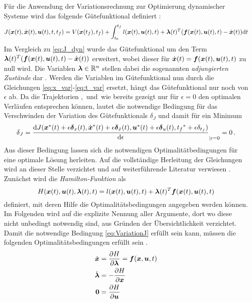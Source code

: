 Für die Anwendung der Variationsrechnung zur Optimierung dynamischer Systeme wird das folgende Gütefunktional definiert \cite{KnutGraichen.2012}:
\begin{equation}
J(\boldsymbol{x}(t),\dot{\boldsymbol{x}}(t),\boldsymbol{u}(t),t,t_f) = V(\boldsymbol{x}(t_f),t_f) + \int_{t_0}^{t_f}l(\boldsymbol{x}(t),\boldsymbol{u}(t),t) + \boldsymbol{\lambda}(t)^T(\boldsymbol{f}(\boldsymbol{x}(t),\boldsymbol{u}(t),t) - \dot{\boldsymbol{x}}(t))\textrm{d}{t} \label{eq:J_var_sys}
\end{equation}
Im Vergleich zu \ref{eq:J_dyn} wurde das Gütefunktional um den Term $\boldsymbol{\lambda}(t)^T(\boldsymbol{f}(\boldsymbol{x}(t),\boldsymbol{u}(t),t) - \dot{\boldsymbol{x}}(t))$ erweitert, wobei dieser für $\dot{\boldsymbol{x}}(t) = \boldsymbol{f}(\boldsymbol{x}(t),\boldsymbol{u}(t),t)$ zu null wird. Die Variablen $\boldsymbol{\lambda}\in\mathbb{R}^n$ stellen dabei die sogenannten \textit{adjungierten Zustände} dar \cite{KnutGraichen.2012}. Werden die Variablen im Gütefunktional nun durch die Gleichungen \ref{eq:x_var}-\ref{eq:t_var} ersetzt, hängt das Gütefunktional nur noch von $\epsilon$ ab. Da die Trajektorien \xoft, \dxoft\,und \uoft\,wie bereits gezeigt nur für $\epsilon=0$ den optimalen Verläufen entsprechen können, lautet die notwendige Bedingung für das Verschwinden der Variation des Gütefunktionals $\delta_J$ und damit für ein Minimum 
\begin{equation}
	\delta_J = \frac{\textrm{d}J({\boldsymbol{x}}^*(t)+\epsilon\boldsymbol{\delta}_{x}(t),\dot{\boldsymbol{x}}^*(t) + \epsilon\boldsymbol{\delta}_{\dot{x}}(t),{\boldsymbol{u}}^*(t) + \epsilon\boldsymbol{\delta}_{u}(t),{t_f}^* + \epsilon\delta_{t_f})}{\textrm{d}{\epsilon}}_{|\epsilon=0}=0\,. \label{eq:VariationJ}
\end{equation}
Aus dieser Bedingung lassen sich die notwendigen Optimalitätbedingungen für eine optimale Lösung herleiten. Auf die vollständige Herleitung der Gleichungen wird an dieser Stelle verzichtet und auf weiterführende Literatur verwiesen \cite{KnutGraichen.2012,Papageorgiou.2012,Gerdts.2010}.
Zunächst wird die \textit{Hamilton-Funktion} als 
\begin{equation}
	H(\boldsymbol{x}(t),\boldsymbol{u}(t),\boldsymbol{\lambda}(t),t) = l(\boldsymbol{x}(t),\boldsymbol{u}(t),t) + \boldsymbol{\lambda}(t)^T\boldsymbol{f}(\boldsymbol{x}(t),\boldsymbol{u}(t),t) \label{eq:Hamilton}
\end{equation}
definiert, mit deren Hilfe die Optimalitätsbedingungen angegeben werden können. Im Folgenden wird auf die explizite Nennung aller Argumente, dort wo diese nicht unbedingt notwendig sind, aus Gründen der Übersichtlichkeit verzichtet. Damit die notwendige Bedingung \ref{eq:VariationJ} erfüllt sein kann, müssen die folgenden Optimalitätsbedingungen erfüllt sein \cite{KnutGraichen.2012}.
\begin{align}
	\dot{\boldsymbol{x}} &= \frac{\partial H}{\partial\boldsymbol{\lambda}} = \boldsymbol{f}(\boldsymbol{x},\boldsymbol{u},t) \label{eq:Zustandsdgl} \\
	\dot{\boldsymbol{\lambda}} &= -\frac{\partial H}{\partial \boldsymbol{x}} \label{eq:Adjdgl} \\
	\boldsymbol{0} &= \frac{\partial H}{\partial \boldsymbol{u}} \label{eq:Steuerungsgleichung} 
\end{align}
